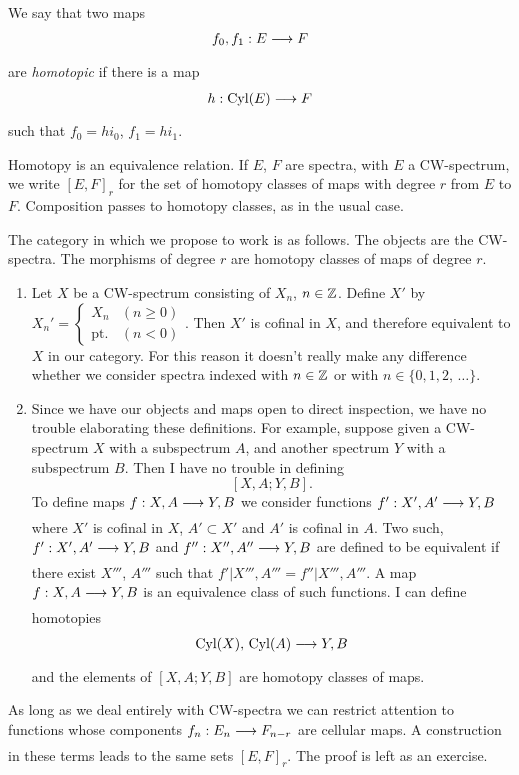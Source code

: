 \documentclass[../main]{subfiles}
\begin{document}
We say that two maps
\[
f_0,f_1: E\lar{} F
\]
are \emph{homotopic} if there is a map
\[
h: \te{Cyl}(E) \lar{} F
\]
such that $f_0=hi_0$, $f_1=hi_1$.

Homotopy is an equivalence relation. If $E$, $F$ are spectra, with $E$ a CW-spectrum, we write $[E,F]_r$ for the set of homotopy classes of maps with degree $r$ from $E$ to $F$. Composition passes to homotopy classes, as in the usual case.

The category in which we propose to work is as follows. The objects are the CW-spectra. The morphisms of degree $r$ are homotopy classes of maps of degree $r$.

\begin{notes}
    \begin{enumerate}
    \item[(i)]  Let $X$ be a CW-spectrum consisting of $X_n$, $n\in \mathbb{Z}$. Define $X'$ by $
    X_n' =
    \begin{cases}
    X_n          &(n\geq 0) \\
    \mathrm{pt.} &(n<0)
    \end{cases}
    $. Then $X'$ is cofinal in $X$, and therefore equivalent to $X$ in our category. For this reason it doesn't really make any difference whether we consider spectra indexed with $n\in\mathbb{Z}$ or with $n\in\{0,1,2,\, \hdots\}$.
    \item[(ii)] Since we have our objects and maps open to direct inspection, we have no trouble elaborating these definitions. For example, suppose given a CW-spectrum $X$ with a subspectrum $A$, and another spectrum $Y$ with a subspectrum $B$. Then I have no trouble in defining
    \[
    [X,A;Y,B].
    \]
    To define maps $f: X,A\lar{} Y,B$ we consider functions $f': X',A'\lar{} Y,B$ where $X'$ is cofinal in $X$, $A'\subset X'$ and $A'$ is cofinal in $A$. Two such, $f': X',A'\lar{} Y,B$ and $f'': X'',A''\lar{} Y,B$ are defined to be equivalent if there exist $X'''$, $A'''$ such that $\left. f' \right\rvert X''',A'''=\left. f''\right\rvert X''',A'''$. A map $f: X,A\lar{} Y,B$ is an equivalence class of such functions. I can define homotopies
    \[
    \te{Cyl}(X),\, \te{Cyl}(A) \lar{} Y,B
    \]
    and the elements of $[X,A;Y,B]$ are homotopy classes of maps.
    \end{enumerate}
\end{notes}

As long as we deal entirely with CW-spectra we can restrict attention to functions whose components $f_n:E_n\lar{} F_{n-r}$ are cellular maps. A construction in these terms leads to the same sets $[E,F]_r$. The proof is left as an exercise.
\end{document}
